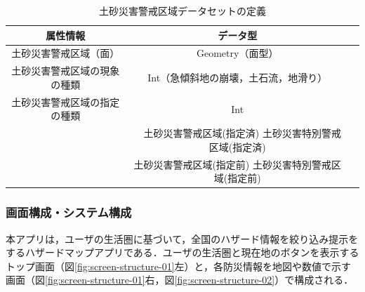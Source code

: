 \documentclass[a4paper]{jsarticle}
\begin{document}
\begin{table}[H]
  \begin{center}
    \caption{土砂災害警戒区域データセットの定義}
    \renewcommand\arraystretch{1.4}
    \begin{tabular}{|c|c|c|}
      \hline
      属性情報 & データ型 \\
      \hline
      \hline
      土砂災害警戒区域（面） & Geometry（面型） \\
      \hline
      土砂災害警戒区域の現象の種類 & Int（急傾斜地の崩壊，土石流，地滑り）\\
      \hline
      土砂災害警戒区域の指定の種類 & Int \\
      & 　土砂災害警戒区域(指定済) 土砂災害特別警戒区域(指定済)　 \\
      & 土砂災害警戒区域(指定前) 土砂災害特別警戒区域(指定前) \\
      \hline
    \end{tabular}
    \label{tab:database-sediment}
  \end{center}
\end{table}

\subsubsection{画面構成・システム構成}
本アプリは，ユーザの生活圏に基づいて，全国のハザード情報を絞り込み提示をするハザードマップアプリである．ユーザの生活圏と現在地のボタンを表示するトップ画面（図\ref{fig:screen-structure-01}左）と，各防災情報を地図や数値で示す画面（図\ref{fig:screen-structure-01}右，図\ref{fig:screen-structure-02}）で構成される．
\end{document}
